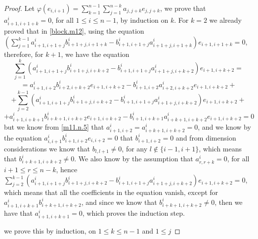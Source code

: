 \documentclass[12pt,fleqn]{article}
\begin{document}
\begin{proof}
Let $\varphi(e_{i,i+1})=\sum_{k=1}^{n-1}\sum_{j=1}^{n-k}a_{j,j+k}e_{j,j+k}$, we prove that $a_{i+1,i+1+k}^i=0$, for all $1\leq i\leq n-1$, by induction on $k$. For $k=2$ we already proved that in \ref{block.m12}, using the equation
$(\sum_{j=1}^{k-1}a_{i+1,i+1+j}^i 
b_{i+1+j,i+1+k}^i-b_{i+1,i+1+j}^i a_{i+1+j,i+1+k}^i)e_{i+1,i+1+k}=0$, therefore, for $k+1$, we have the equation
\[\sum_{j=1}^{k}(a_{i+1,i+1+j}^i 
b_{i+1+j,i+k+2}^i-b_{i+1,i+1+j}^i a_{i+1+j,i+k+2}^i)e_{i+1,i+k+2}=\]\[=a_{i+1,i+2}^i b_{i+2,i+k+2}^i e_{i+1,i+k+2}-b_{i+1,i+2}^i a_{i+2,i+k+2}^i e_{i+1,i+k+2}+\]\[+\sum_{j=2}^{k-1}(a_{i+1,i+1+j}^i 
b_{i+1+j,i+k+2}^i-b_{i+1,i+1+j}^i a_{i+1+j,i+k+2}^i)e_{i+1,i+k+2}+\]\[+a_{i+1,i+k+1}^i b_{i+k+1,i+k+2}^i e_{i+1,i+k+2}-b_{i+1,i+k+1}^i a_{i+k+1,i+k+2}^i e_{i+1,i+k+2}=0\]
but we know from \ref{m11.n.5} that $a_{i+1,i+2}^i=a_{i+k+1,i+k+2}^i=0$, and we know by the equation $a_{i,i+1}^i b_{i+1,i+2}^i e_{i,i+2}=0$ that $b_{i+1,i+2}^i=0$ and from dimension considerations we know that $b_{l,l+1}\neq 0$, for any $l\notin\{i-1,i+1\}$, which means that $b_{i+k+1,i+k+2}^i\neq 0$. We also know by the assumption that $a_{r,r+k}^i=0$, for all $i+1\leq r\leq n-k$, hence $\sum_{j=2}^{k-1}(a_{i+1,i+1+j}^i 
b_{i+1+j,i+k+2}^i-b_{i+1,i+1+j}^i a_{i+1+j,i+k+2}^i)e_{i+1,i+k+2}=0$, which means that all the coefficients in the equation vanish, except for $a_{i+1,i+k+1}^i b_{i+k+1,i+k+2}^i$, and since we know that $b_{i+k+1,i+k+2}^i\neq 0$, then we have that $a_{i+1,i+k+1}^i=0$, which proves the induction step.



we prove this by induction, on $1\leq k\leq n-1$ and $1\leq j$



\end{proof}
\end{document}
